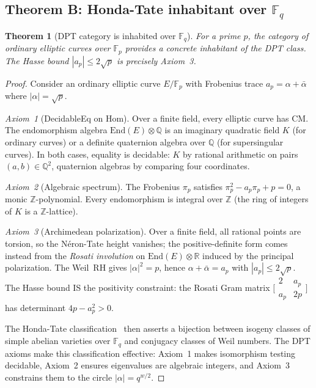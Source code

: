 \documentclass[11pt]{article}
\newtheorem{theorem}{Theorem}[section]
\theoremstyle{definition}
\theoremstyle{remark}
\newcommand{\Z}{\mathbb{Z}}
\newcommand{\Q}{\mathbb{Q}}
\newcommand{\R}{\mathbb{R}}
\newcommand{\Fq}{\mathbb{F}_q}
\newcommand{\Fp}{\mathbb{F}_p}
\begin{document}
\subsection{Theorem B: Honda-Tate inhabitant over $\Fq$}

\begin{theorem}[DPT category is inhabited over $\Fq$]
\label{thm:B}
For a prime $p$, the category of ordinary elliptic curves over $\Fp$ provides a concrete inhabitant of the DPT class. The Hasse bound $|a_p| \leq 2\sqrt{p}$ is precisely Axiom~3.
\end{theorem}

\begin{proof}
Consider an ordinary elliptic curve $E/\Fp$ with Frobenius trace $a_p = \alpha + \bar\alpha$ where $|\alpha| = \sqrt{p}$.

\emph{Axiom~1} (DecidableEq on Hom). Over a finite field, every elliptic curve has CM. The endomorphism algebra $\mathrm{End}(E) \otimes \Q$ is an imaginary quadratic field $K$ (for ordinary curves) or a definite quaternion algebra over $\Q$ (for supersingular curves). In both cases, equality is decidable: $K$ by rational arithmetic on pairs $(a,b) \in \Q^2$, quaternion algebras by comparing four coordinates.

\emph{Axiom~2} (Algebraic spectrum). The Frobenius $\pi_p$ satisfies $\pi_p^2 - a_p \pi_p + p = 0$, a monic $\Z$-polynomial. Every endomorphism is integral over $\Z$ (the ring of integers of $K$ is a $\Z$-lattice).

\emph{Axiom~3} (Archimedean polarization). Over a finite field, all rational points are torsion, so the N\'eron-Tate height vanishes; the positive-definite form comes instead from the \emph{Rosati involution} on $\mathrm{End}(E) \otimes \R$ induced by the principal polarization. The Weil~RH gives $|\alpha|^2 = p$, hence $\alpha + \bar\alpha = a_p$ with $|a_p| \leq 2\sqrt{p}$. The Hasse bound IS the positivity constraint: the Rosati Gram matrix $\bigl[\begin{smallmatrix} 2 & a_p \\ a_p & 2p \end{smallmatrix}\bigr]$ has determinant $4p - a_p^2 > 0$.

The Honda-Tate classification~\cite{Tate1966,Honda1968} then asserts a bijection between isogeny classes of simple abelian varieties over $\Fq$ and conjugacy classes of Weil numbers. The DPT axioms make this classification effective: Axiom~1 makes isomorphism testing decidable, Axiom~2 ensures eigenvalues are algebraic integers, and Axiom~3 constrains them to the circle $|\alpha| = q^{w/2}$.
\end{proof}
\end{document}
